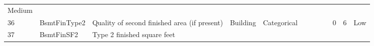 \documentclass[11pt]{article}
\begin{document}
\begin{longtable}[]{@{}llllllllllll@{}}
\begin{minipage}[t]{0.04\columnwidth}
Medium\strut
\end{minipage}\tabularnewline
\begin{minipage}[t]{0.04\columnwidth}\raggedright\strut
36\strut
\end{minipage} & \begin{minipage}[t]{0.04\columnwidth}\raggedright\strut
BsmtFinType2\strut
\end{minipage} & \begin{minipage}[t]{0.04\columnwidth}\raggedright\strut
Quality of second finished area (if present)\strut
\end{minipage} & \begin{minipage}[t]{0.04\columnwidth}\raggedright\strut
Building\strut
\end{minipage} & \begin{minipage}[t]{0.04\columnwidth}\raggedright\strut
Categorical\strut
\end{minipage} & \begin{minipage}[t]{0.04\columnwidth}\raggedright\strut
\strut
\end{minipage} & \begin{minipage}[t]{0.04\columnwidth}\raggedright\strut
\strut
\end{minipage} & \begin{minipage}[t]{0.04\columnwidth}\raggedright\strut
\strut
\end{minipage} & \begin{minipage}[t]{0.04\columnwidth}\raggedright\strut
\strut
\end{minipage} & \begin{minipage}[t]{0.04\columnwidth}\raggedright\strut
0\strut
\end{minipage} & \begin{minipage}[t]{0.04\columnwidth}\raggedright\strut
6\strut
\end{minipage} & \begin{minipage}[t]{0.04\columnwidth}\raggedright\strut
Low\strut
\end{minipage}\tabularnewline
\begin{minipage}[t]{0.04\columnwidth}\raggedright\strut
37\strut
\end{minipage} & \begin{minipage}[t]{0.04\columnwidth}\raggedright\strut
BsmtFinSF2\strut
\end{minipage} & \begin{minipage}[t]{0.04\columnwidth}\raggedright\strut
Type 2 finished square feet\strut
\end{minipage} & \begin{minipage}[t]{0.04\columnwidth}\raggedright\strut

\end{minipage}
\end{longtable}
\end{document}
